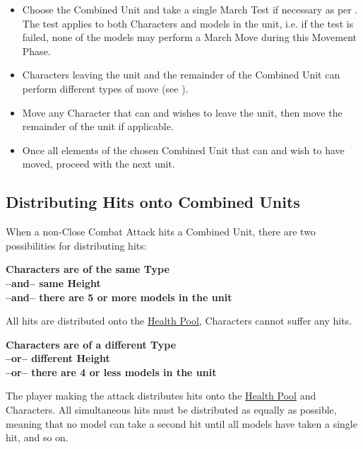\begin{itemize}
\item Choose the Combined Unit and take a single March Test if necessary as per . The test applies to both Characters and \rnf{} models in the unit, i.e. if the test is failed, none of the models may perform a March Move during this Movement Phase.
\item Characters leaving the unit and the remainder of the Combined Unit can perform different types of move (see ).
\item Move any Character that can and wishes to leave the unit, then move the remainder of the unit if applicable.
\item Once all elements of the chosen Combined Unit that can and wish to have moved, proceed with the next unit.
\end{itemize}

\subsection{Distributing Hits onto Combined Units}

When a non-Close Combat Attack hits a Combined Unit, there are two possibilities for distributing hits:

\begin{minipage}[t]{0.47\textwidth}
  \begin{center}
    \textbf{%
    Characters are of the same Type\\%
    --and-- same Height\\%
    --and-- there are 5 or more \rnf{} models in the unit%
    }
  \end{center}

  \vspace*{8pt}
  All hits are distributed onto the \rnf{} \hyperref[health_pools]{Health Pool}, Characters cannot suffer any hits.
\end{minipage}%
\hfill%
\begin{minipage}[t]{0.47\textwidth}
  \begin{center}
    \textbf{%
      Characters are of a different Type\\%
      --or-- different Height\\%
      --or-- there are 4 or less \rnf{} models in the unit%
    }
  \end{center}
   \vspace*{8pt}
  The player making the attack distributes hits onto the \rnf{} \hyperref[health_pools]{Health Pool} and Characters. All simultaneous hits must be distributed as equally as possible, meaning that no model can take a second hit until all models have taken a single hit, and so on.
\end{minipage}

